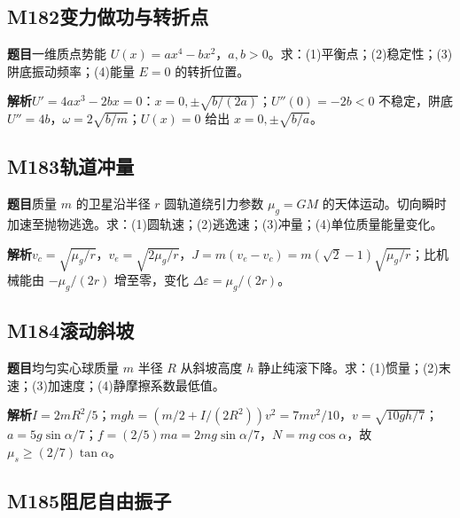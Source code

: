 \par\medskip

\subsection*{M182\quad 变力做功与转折点}

\textbf{题目}\quad 一维质点势能 $U(x)=ax^4-bx^2$，$a,b>0$。求：(1)平衡点；(2)稳定性；(3)阱底振动频率；(4)能量 $E=0$ 的转折位置。

\par\textbf{解析}\quad $U'=4ax^3-2bx=0$：$x=0,\pm\sqrt{b/(2a)}$；$U''(0)=-2b<0$ 不稳定，阱底 $U''=4b$，$\omega=2\sqrt{b/m}$；$U(x)=0$ 给出 $x=0,\pm\sqrt{b/a}$。

\par\medskip

\subsection*{M183\quad 轨道冲量}

\textbf{题目}\quad 质量 $m$ 的卫星沿半径 $r$ 圆轨道绕引力参数 $\mu_g=GM$ 的天体运动。切向瞬时加速至抛物逃逸。求：(1)圆轨速；(2)逃逸速；(3)冲量；(4)单位质量能量变化。

\par\textbf{解析}\quad $v_c=\sqrt{\mu_g/r}$，$v_e=\sqrt{2\mu_g/r}$，$J=m(v_e-v_c)=m(\sqrt2-1)\sqrt{\mu_g/r}$；比机械能由 $-\mu_g/(2r)$ 增至零，变化 $\Delta\varepsilon=\mu_g/(2r)$。

\par\medskip

\subsection*{M184\quad 滚动斜坡}

\textbf{题目}\quad 均匀实心球质量 $m$ 半径 $R$ 从斜坡高度 $h$ 静止纯滚下降。求：(1)惯量；(2)末速；(3)加速度；(4)静摩擦系数最低值。

\par\textbf{解析}\quad $I=2mR^2/5$；$mgh=(m/2+I/(2R^2))v^2=7mv^2/10$，$v=\sqrt{10gh/7}$；$a=5g\sin\alpha/7$；$f=(2/5)ma=2mg\sin\alpha/7$，$N=mg\cos\alpha$，故 $\mu_s\ge(2/7)\tan\alpha$。

\par\medskip

\subsection*{M185\quad 阻尼自由振子}

